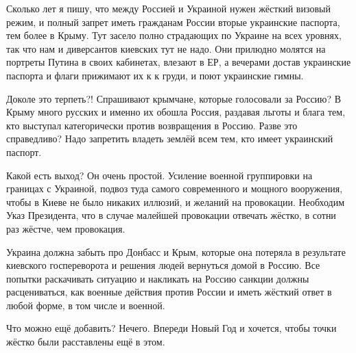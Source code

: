 Сколько лет я пишу, что между Россией и Украиной нужен жёсткий визовый режим, и
полный запрет иметь гражданам России вторые украинские паспорта, тем более в
Крыму. Тут засело полно страдающих по Украине на всех уровнях, так что нам и
диверсантов киевских тут не надо. Они прилюдно молятся на портреты Путина в
своих кабинетах, влезают в ЕР, а вечерами достав украинские паспорта и флаги
прижимают их к к груди, и поют украинские гимны. 

Доколе это терпеть?! Спрашивают крымчане, которые голосовали за Россию? В Крыму
много русских и именно их обошла Россия, раздавая льготы и блага тем, кто
выступал категорически против возвращения в Россию. Разве это справедливо? Надо
запретить владеть землёй всем тем, кто имеет украинский паспорт.

Какой есть выход? Он очень простой. Усиление военной группировки на границах с
Украиной, подвоз туда самого современного и мощного вооружения, чтобы в Киеве
не было никаких иллюзий, и желаний на провокации. Необходим Указ Президента,
что в случае малейшей провокации отвечать жёстко, в сотни раз жёстче, чем
провокация.

Украина должна забыть про Донбасс и Крым, которые она потеряла в результате
киевского госпереворота и решения людей вернуться домой в Россию. Все попытки
раскачивать ситуацию и накликать на Россию санкции должны расцениваться, как
военные действия против России и иметь жёсткий ответ в любой форме, в том числе
и военной. 

Что можно ещё добавить? Нечего. Впереди Новый Год и хочется, чтобы точки
жёстко были расставлены ещё в этом.  
